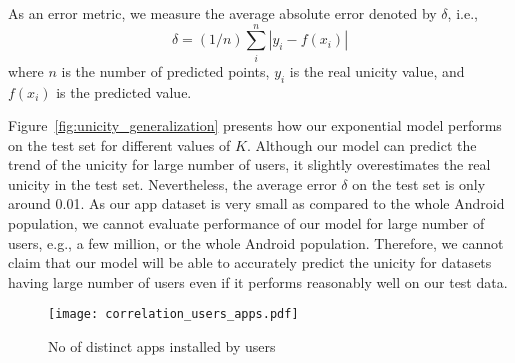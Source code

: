 \documentclass{acm_proc_article-sp}
\theoremstyle{plain}
\theoremstyle{plain}
\theoremstyle{plain}
\theoremstyle{plain}
\theoremstyle{plain}
\theoremstyle{plain}
\begin{document}
As an error metric, we measure the average absolute error denoted by $\delta$, i.e., 
$$
\delta = (1/n) \sum_{i}^{n} \left| y_i - f(x_i)\right|
$$
where $n$ is the number of predicted points,  $y_i$ is the real unicity value, and $f(x_i)$ is the predicted value.

Figure~\ref{fig:unicity_generalization} presents how our exponential model performs on the test set for different values of $K$.
Although our model can predict the trend of the unicity for large number of users, it slightly overestimates the real unicity in the test set.
Nevertheless, the average error $\delta$ on the test set is only around 0.01. 
As our app dataset is very small as compared to the whole Android population, we cannot evaluate performance of our model for large number of users, e.g., a few million, or the whole Android population.
Therefore, we cannot claim that our model will be able to accurately predict the unicity for datasets having large number of users even if it performs reasonably well on our test data.
















\begin{figure}[!t]
        \centering
	\texttt{[image: correlation\_users\_apps.pdf]}
	\caption{No of distinct apps installed by users}
	\label{fig:correlation_users_apps}
\end{figure}
\end{document}
